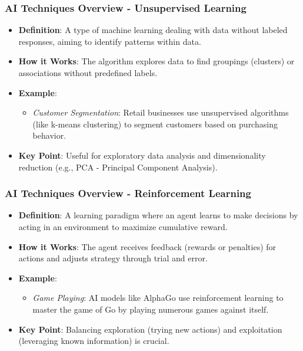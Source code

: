 \documentclass{beamer}
\begin{document}
\begin{frame}[fragile]
    \frametitle{AI Techniques Overview - Unsupervised Learning}
    \begin{itemize}
        \item \textbf{Definition}: A type of machine learning dealing with data without labeled responses, aiming to identify patterns within data.
        \item \textbf{How it Works}: The algorithm explores data to find groupings (clusters) or associations without predefined labels.
        \item \textbf{Example}: 
        \begin{itemize}
            \item \textit{Customer Segmentation}: Retail businesses use unsupervised algorithms (like k-means clustering) to segment customers based on purchasing behavior.
        \end{itemize}
        \item \textbf{Key Point}: Useful for exploratory data analysis and dimensionality reduction (e.g., PCA - Principal Component Analysis).
    \end{itemize}
\end{frame}

\begin{frame}[fragile]
    \frametitle{AI Techniques Overview - Reinforcement Learning}
    \begin{itemize}
        \item \textbf{Definition}: A learning paradigm where an agent learns to make decisions by acting in an environment to maximize cumulative reward.
        \item \textbf{How it Works}: The agent receives feedback (rewards or penalties) for actions and adjusts strategy through trial and error.
        \item \textbf{Example}: 
        \begin{itemize}
            \item \textit{Game Playing}: AI models like AlphaGo use reinforcement learning to master the game of Go by playing numerous games against itself.
        \end{itemize}
        \item \textbf{Key Point}: Balancing exploration (trying new actions) and exploitation (leveraging known information) is crucial.
    \end{itemize}
\end{frame}
\end{document}
